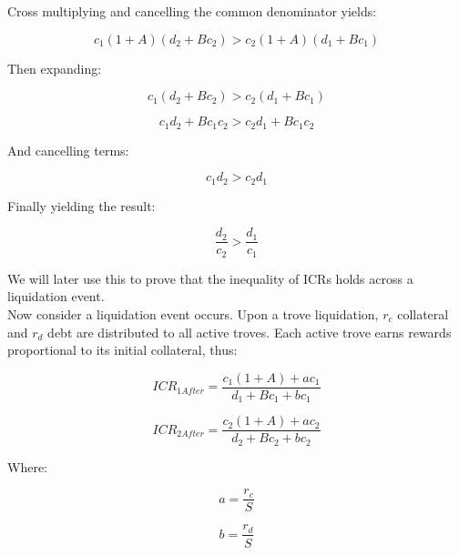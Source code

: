 \documentclass[reqno]{article}
\begin{document}
\bigskip
Cross multiplying and cancelling the common denominator yields:

\begin{equation} 
    c_1\left(1+A\right)\left(d_2+Bc_2\right)>c_2\left(1+A\right)\left(d_1+Bc_1\right)
\end{equation}

Then expanding:

\begin{equation} 
    c_1\left(d_2+Bc_2\right)>c_2\left(d_1+Bc_1\right)
\end{equation}

\begin{equation} 
    c_1d_2+Bc_1c_2 > c_2d_1+Bc_1c_2
\end{equation}

\bigskip
And cancelling terms:

\begin{equation}
    c_1d_2 > c_2d_1
\end{equation}

\bigskip
Finally yielding the result:

\begin{equation} \label{eq:217}
    \frac{d_2}{c_2}>\frac{d_1}{c_1}
\end{equation}

\bigskip
We will later use this to prove that the inequality of ICRs holds across a liquidation event.\\

Now consider a liquidation event occurs. Upon a trove liquidation, $r_c$ collateral and $r_d$ debt are distributed to all active troves. Each active trove earns rewards proportional to its initial collateral, thus:

\begin{equation} 
    ICR_{1After}=\frac{c_1\left(1+A\right)+ac_1}{d_1+Bc_1+bc_1}
\end{equation}

\begin{equation} 
    ICR_{2After}=\frac{c_2\left(1+A\right)+ac_2}{d_2+Bc_2+bc_2}
\end{equation}

\bigskip
Where:

\begin{equation} 
    a=\frac{r_c}{S}
\end{equation}

\begin{equation} 
    b=\frac{r_d}{S}
\end{equation}
\end{document}

